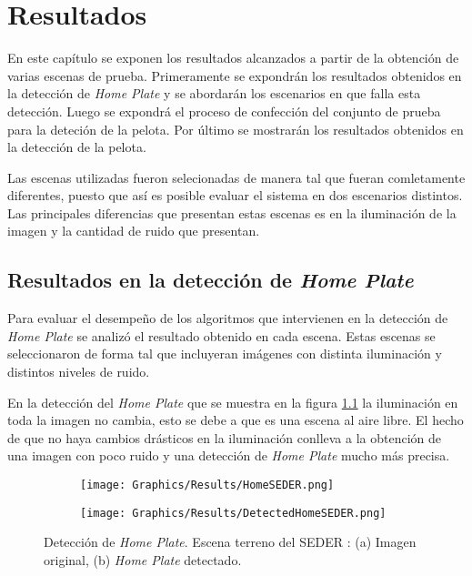 \chapter{Resultados}\label{chapter:results}

En este capítulo se exponen los resultados alcanzados a partir de la obtención de varias escenas de prueba. Primeramente se expondrán los resultados obtenidos en la detección de \textit{Home Plate} y se abordarán los escenarios en que falla esta detección. Luego se expondrá el proceso de confección del conjunto de prueba para la deteción de la pelota. Por último se mostrarán los resultados obtenidos en la detección de la pelota.

Las escenas utilizadas fueron selecionadas de manera tal que fueran comletamente diferentes, puesto que así es posible evaluar el sistema en dos escenarios distintos. Las principales diferencias que presentan estas escenas es en la iluminación de la imagen y la cantidad de ruido que presentan.

\section{Resultados en la detección de \textit{Home Plate}}

Para evaluar el desempeño de los algoritmos que intervienen en la detección de \textit{Home Plate} se analizó el resultado obtenido en cada escena. Estas escenas se seleccionaron de forma tal que incluyeran imágenes con distinta iluminación y distintos niveles de ruido.

En la detección del \textit{Home Plate} que se muestra en la figura \ref{fig:DetectedHomeSEDER} la iluminación en toda la imagen no cambia, esto se debe a que es una escena al aire libre. El hecho de que no haya cambios drásticos en la iluminación conlleva a la obtención de una imagen con poco ruido y una detección de \textit{Home Plate} mucho más precisa.

\begin{figure}[h!]
    \centering
    \begin{subfigure}[b]{0.32\linewidth}
        \texttt{[image: Graphics/Results/HomeSEDER.png]}
        \caption{}
    \end{subfigure}
    \begin{subfigure}[b]{0.32\linewidth}
        \texttt{[image: Graphics/Results/DetectedHomeSEDER.png]}
        \caption{}
    \end{subfigure}
    \caption{Detección de \textit{Home Plate}. Escena terreno del SEDER : (a) Imagen original, (b)\textit{ Home Plate} detectado.}
    \label{fig:DetectedHomeSEDER}
\end{figure}

